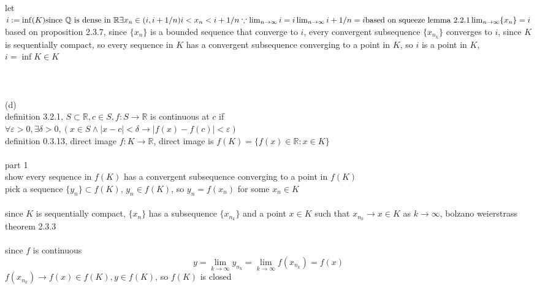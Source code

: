 \documentclass[12pt, border = 4pt, multi]{article} %
\begin{document}
\\
\\
\\
let $i := \inf(K)\\
\text{since } \mathbb{Q} \text{ is dense in } \mathbb{R}\\
\exists x_n \in (i, i + 1 / n)\\
i < x_n < i + 1 / n\\
\because \lim_{n \rightarrow \infty} i = i\\
\lim_{n \rightarrow \infty} i + 1 / n = i\\
\text{based on squeeze lemma 2.2.1}\\
\lim_{n \rightarrow \infty} \{x_n\} = i\\$
based on proposition 2.3.7, since $\{x_n\}$ is a bounded sequence that converge to $i$, every convergent subsequence $\{x_{n_k}\}$ converges to $i$, since $K$ is sequentially compact, so every sequence in $K$ has a convergent subsequence converging to a point in $K$, so $i$ is a point in $K$, $i = \inf K \in K$\\
\\
\\
\\
(d)\\
definition 3.2.1, $S \subset \mathbb{R}, c \in S, f: S \rightarrow \mathbb{R}$ is continuous at $c$ if\\
$\forall \varepsilon > 0, \exists \delta > 0, (x \in S \wedge |x - c| < \delta \rightarrow |f(x) - f(c)| < \varepsilon)$\\
definition 0.3.13, direct image $f: K \rightarrow \mathbb{R}$, direct image is $f(K) = \{f(x) \in \mathbb{R}: x \in K\}$\\
\\
part 1\\
show every sequence in $f(K)$ has a convergent subsequence converging to a point in $f(K)$\\
pick a sequence $\{y_n\} \subset f(K)$, $y_n \in f(K)$, so $y_n = f(x_n)$ for some $x_n \in K$\\
\\
since $K$ is sequentially compact, $\{x_n\}$ has a subsequence $\{x_{n_k}\}$ and a point $x \in K$ such that $x_{n_k} \rightarrow x \in K$ as $k \rightarrow \infty$, bolzano weierstrass theorem 2.3.3\\
\\
since $f$ is continuous
\[y = \lim_{k \rightarrow \infty} y_{n_k} = \lim_{k \rightarrow \infty} f(x_{n_k}) = f(x)\]
$f(x_{n_k}) \rightarrow f(x) \in f(K), y \in f(K)$, so $f(K)$ is closed\\
\end{document}
